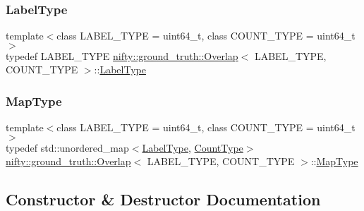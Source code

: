\mbox{\label{classnifty_1_1ground__truth_1_1Overlap_af14b9a872d3736d3115231866bc71612}} 
\subsubsection{\texorpdfstring{Label\+Type}{LabelType}}
{\footnotesize\ttfamily template$<$class L\+A\+B\+E\+L\+\_\+\+T\+Y\+PE  = uint64\+\_\+t, class C\+O\+U\+N\+T\+\_\+\+T\+Y\+PE  = uint64\+\_\+t$>$ \\
typedef L\+A\+B\+E\+L\+\_\+\+T\+Y\+PE \hyperlink{classnifty_1_1ground__truth_1_1Overlap}{nifty\+::ground\+\_\+truth\+::\+Overlap}$<$ L\+A\+B\+E\+L\+\_\+\+T\+Y\+PE, C\+O\+U\+N\+T\+\_\+\+T\+Y\+PE $>$\+::\hyperlink{classnifty_1_1ground__truth_1_1Overlap_af14b9a872d3736d3115231866bc71612}{Label\+Type}}

\mbox{\label{classnifty_1_1ground__truth_1_1Overlap_a6866ee8c988dd21d3fbd6ee5c2e836bf}} 
\subsubsection{\texorpdfstring{Map\+Type}{MapType}}
{\footnotesize\ttfamily template$<$class L\+A\+B\+E\+L\+\_\+\+T\+Y\+PE  = uint64\+\_\+t, class C\+O\+U\+N\+T\+\_\+\+T\+Y\+PE  = uint64\+\_\+t$>$ \\
typedef std\+::unordered\+\_\+map$<$\hyperlink{classnifty_1_1ground__truth_1_1Overlap_af14b9a872d3736d3115231866bc71612}{Label\+Type}, \hyperlink{classnifty_1_1ground__truth_1_1Overlap_ab8f82b8fef890dc3d7b69da0cc768c76}{Count\+Type}$>$ \hyperlink{classnifty_1_1ground__truth_1_1Overlap}{nifty\+::ground\+\_\+truth\+::\+Overlap}$<$ L\+A\+B\+E\+L\+\_\+\+T\+Y\+PE, C\+O\+U\+N\+T\+\_\+\+T\+Y\+PE $>$\+::\hyperlink{classnifty_1_1ground__truth_1_1Overlap_a6866ee8c988dd21d3fbd6ee5c2e836bf}{Map\+Type}}



\subsection{Constructor \& Destructor Documentation}
\mbox{\label{classnifty_1_1ground__truth_1_1Overlap_aedaa9af95b736f17f2dbfe0eff4c09bf}} 

